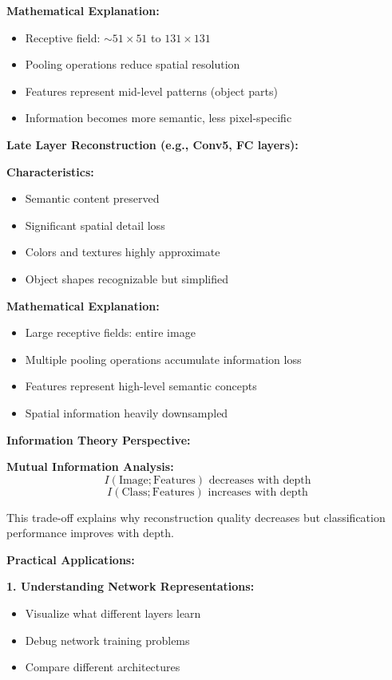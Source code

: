 \documentclass[12pt]{article}
\begin{document}
\begin{enumerate}[(a)]
{    \textbf{Mathematical Explanation:}
    \begin{itemize}
        \item Receptive field: $\sim 51 \times 51$ to $131 \times 131$
        \item Pooling operations reduce spatial resolution
        \item Features represent mid-level patterns (object parts)
        \item Information becomes more semantic, less pixel-specific
    \end{itemize}
    
    \textbf{Late Layer Reconstruction (e.g., Conv5, FC layers):}
    
    \textbf{Characteristics:}
    \begin{itemize}
        \item Semantic content preserved
        \item Significant spatial detail loss
        \item Colors and textures highly approximate
        \item Object shapes recognizable but simplified
    \end{itemize}
    
    \textbf{Mathematical Explanation:}
    \begin{itemize}
        \item Large receptive fields: entire image
        \item Multiple pooling operations accumulate information loss
        \item Features represent high-level semantic concepts
        \item Spatial information heavily downsampled
    \end{itemize}
    
    \textbf{Information Theory Perspective:}
    
    \textbf{Mutual Information Analysis:}
    $$I(\text{Image}; \text{Features}) \text{ decreases with depth}$$
    $$I(\text{Class}; \text{Features}) \text{ increases with depth}$$
    
    This trade-off explains why reconstruction quality decreases but classification performance improves with depth.
    
    \textbf{Practical Applications:}
    
    \textbf{1. Understanding Network Representations:}
    \begin{itemize}
        \item Visualize what different layers learn
        \item Debug network training problems
        \item Compare different architectures
    \end{itemize}
    
}
\end{enumerate}
\end{document}
